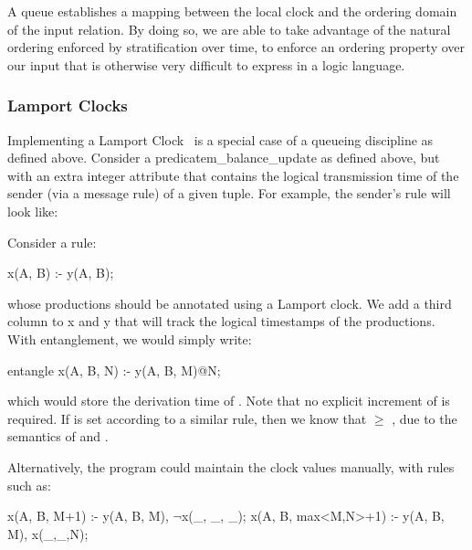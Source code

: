 A queue establishes a mapping between the local clock and the ordering domain of the input relation. By doing so, we are able to take
advantage of the natural ordering enforced by stratification over time, to enforce an ordering property over our input that is otherwise 
very difficult to express in a logic language.

\subsubsection{Lamport Clocks}

Implementing a Lamport Clock~\cite{timeclocks} is a special case of a queueing discipline as defined above.
Consider a predicate{m\_balance\_update} as defined above, but with an extra integer attribute that contains the logical transmission
time of the sender (via a message rule) of a given tuple.  For example, the sender's rule will look like: 


Consider a rule:
\begin{Dedalus}
x(A, B) :- y(A, B);
\end{Dedalus}
whose productions should be annotated using a Lamport clock.  We add a
third column to x and y that will track the logical timestamps of the
productions.  With entanglement, we would simply write:

\begin{Dedalus}
entangle
x(A, B, N) :- y(A, B, M)@N;
\end{Dedalus}

which would store the derivation time of .  Note that no explicit
increment of  is required.  If  is set according to a similar
rule, then we know that  $\ge$ , due to the semantics of
 and .

Alternatively, the program could maintain the clock values manually,
with rules such as:

\begin{Dedalus}
x(A, B, M+1) :- y(A, B, M), \(\neg\)x(_, _, _);
x(A, B, max<M,N>+1) :- y(A, B, M), x(_,_,N); 
\end{Dedalus}

